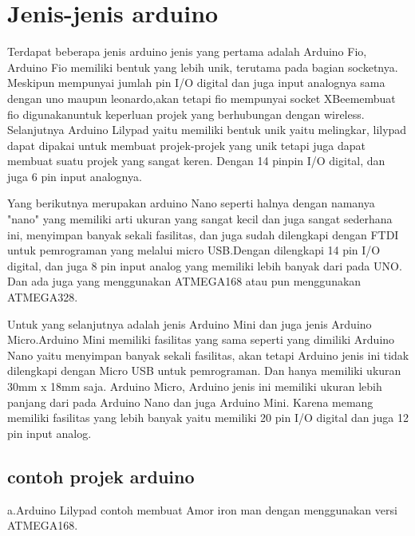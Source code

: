 \section{Jenis-jenis arduino}
	Terdapat beberapa jenis arduino jenis yang pertama adalah Arduino Fio, Arduino Fio memiliki bentuk yang lebih unik, terutama pada bagian socketnya. Meskipun mempunyai jumlah pin I/O digital dan juga input analognya sama dengan uno maupun leonardo,akan tetapi fio mempunyai socket XBeemembuat fio digunakanuntuk keperluan projek yang berhubungan dengan wireless. Selanjutnya Arduino Lilypad yaitu memiliki bentuk unik yaitu melingkar, lilypad dapat dipakai untuk membuat projek-projek yang unik tetapi juga dapat membuat suatu projek yang sangat keren.
	Dengan 14 pinpin I/O digital, dan juga 6 pin input analognya.


	Yang berikutnya merupakan arduino Nano seperti halnya dengan namanya "nano" yang memiliki arti ukuran  yang sangat kecil dan juga sangat sederhana ini, menyimpan banyak sekali fasilitas, dan juga sudah dilengkapi dengan FTDI untuk pemrograman yang melalui micro USB.Dengan dilengkapi 14 pin I/O digital, dan juga 8 pin input analog yang memiliki lebih banyak dari pada UNO. Dan ada juga yang menggunakan ATMEGA168 atau pun menggunakan ATMEGA328.

	Untuk yang selanjutnya adalah jenis Arduino Mini dan juga jenis Arduino Micro.Arduino Mini memiliki fasilitas yang sama seperti yang dimiliki Arduino Nano yaitu menyimpan banyak sekali fasilitas, akan tetapi Arduino jenis ini tidak dilengkapi dengan Micro USB untuk pemrograman. Dan hanya memiliki ukuran 30mm x 18mm saja.
	Arduino Micro, Arduino jenis ini memiliki ukuran lebih panjang dari pada Arduino Nano dan juga Arduino Mini. Karena memang memiliki fasilitas yang lebih banyak yaitu memiliki 20 pin I/O digital dan juga 12 pin input analog.

\subsection{contoh projek arduino}
	a.Arduino Lilypad contoh membuat Amor iron man dengan menggunakan versi ATMEGA168.

